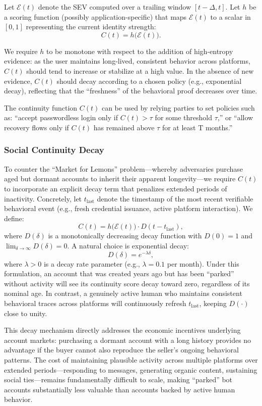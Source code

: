 \documentclass[11pt]{article}
\begin{document}
Let $\mathcal{E}(t)$ denote the SEV computed over a trailing window $[t - \Delta, t]$. Let $h$ be a scoring function (possibly application-specific) that maps $\mathcal{E}(t)$ to a scalar in $[0,1]$ representing the current identity strength:
\[
  C(t) = h\big(\mathcal{E}(t)\big).
\]

We require $h$ to be monotone with respect to the addition of high-entropy evidence: as the user maintains long-lived, consistent behavior across platforms, $C(t)$ should tend to increase or stabilize at a high value. In the absence of new evidence, $C(t)$ should decay according to a chosen policy (e.g., exponential decay), reflecting that the ``freshness'' of the behavioral proof decreases over time.

The continuity function $C(t)$ can be used by relying parties to set policies such as: ``accept passwordless login only if $C(t) > \tau$ for some threshold $\tau$,'' or ``allow recovery flows only if $C(t)$ has remained above $\tau$ for at least T months.''

\subsubsection{Social Continuity Decay}

To counter the ``Market for Lemons'' problem---whereby adversaries purchase aged but dormant accounts to inherit their apparent longevity---we require $C(t)$ to incorporate an explicit decay term that penalizes extended periods of inactivity. Concretely, let $t_{\text{last}}$ denote the timestamp of the most recent verifiable behavioral event (e.g., fresh credential issuance, active platform interaction). We define:
\[
  C(t) = h\big(\mathcal{E}(t)\big) \cdot D(t - t_{\text{last}}),
\]
where $D(\delta)$ is a monotonically decreasing decay function with $D(0) = 1$ and $\lim_{\delta \to \infty} D(\delta) = 0$. A natural choice is exponential decay:
\[
  D(\delta) = e^{-\lambda \delta},
\]
where $\lambda > 0$ is a decay rate parameter (e.g., $\lambda = 0.1$ per month). Under this formulation, an account that was created years ago but has been ``parked'' without activity will see its continuity score decay toward zero, regardless of its nominal age. In contrast, a genuinely active human who maintains consistent behavioral traces across platforms will continuously refresh $t_{\text{last}}$, keeping $D(\cdot)$ close to unity.

This decay mechanism directly addresses the economic incentives underlying account markets: purchasing a dormant account with a long history provides no advantage if the buyer cannot also reproduce the seller's ongoing behavioral patterns. The cost of maintaining plausible activity across multiple platforms over extended periods---responding to messages, generating organic content, sustaining social ties---remains fundamentally difficult to scale, making ``parked'' bot accounts substantially less valuable than accounts backed by active human behavior.
\end{document}
